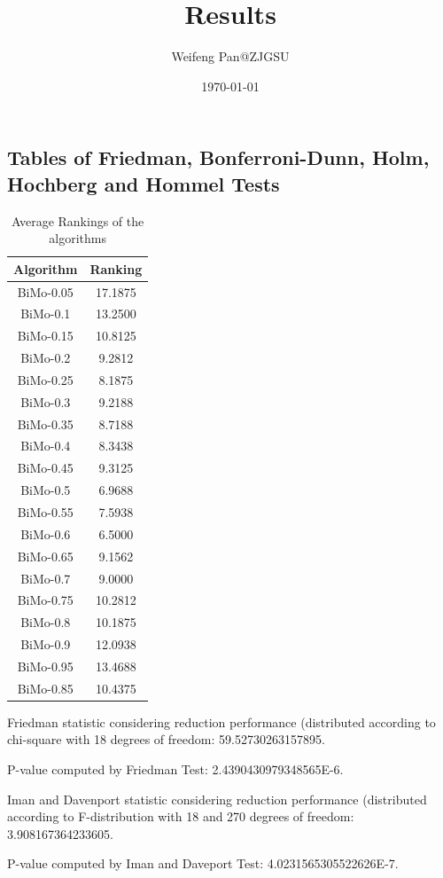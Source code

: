 \documentclass[a4paper,10pt]{article}
\title{Results}
\author{Weifeng Pan@ZJGSU}
\date{\today}
\begin{document}
\begin{landscape}
\oddsidemargin 0in \topmargin 0in\maketitle
\section{Tables of Friedman, Bonferroni-Dunn, Holm, Hochberg and Hommel Tests}
\begin{table}[!htp]
\centering
\caption{Average Rankings of the algorithms
}\begin{tabular}{c|c}
Algorithm&Ranking\\
\hline
BiMo-0.05&17.1875\\
BiMo-0.1&13.2500\\
BiMo-0.15&10.8125\\
BiMo-0.2&9.2812\\
BiMo-0.25&8.1875\\
BiMo-0.3&9.2188\\
BiMo-0.35&8.7188\\
BiMo-0.4&8.3438\\
BiMo-0.45&9.3125\\
BiMo-0.5&6.9688\\
BiMo-0.55&7.5938\\
BiMo-0.6&6.5000\\
BiMo-0.65&9.1562\\
BiMo-0.7&9.0000\\
BiMo-0.75&10.2812\\
BiMo-0.8&10.1875\\
BiMo-0.9&12.0938\\
BiMo-0.95&13.4688\\
BiMo-0.85&10.4375\\
\end{tabular}
\end{table}


Friedman statistic considering reduction performance (distributed according to chi-square with 18 degrees of freedom: 59.52730263157895.


P-value computed by Friedman Test: 2.4390430979348565E-6.\newline

Iman and Davenport statistic considering reduction performance (distributed according to F-distribution with 18 and 270 degrees of freedom: 3.908167364233605.


P-value computed by Iman and Daveport Test: 4.0231565305522626E-7.\newline


\end{landscape}
\end{document}
